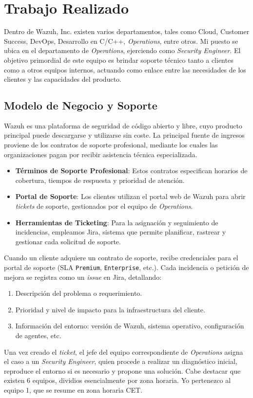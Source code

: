 \chapter{Trabajo Realizado}

Dentro de Wazuh, Inc. existen varios departamentos, tales como Cloud, Customer Success, DevOps, Desarrollo en C/C++, \emph{Operations}, entre otros. Mi puesto se ubica en el departamento de \emph{Operations}, ejerciendo como \emph{Security Engineer}. El objetivo primordial de este equipo es brindar soporte técnico tanto a clientes como a otros equipos internos, actuando como enlace entre las necesidades de los clientes y las capacidades del producto.

\section{Modelo de Negocio y Soporte}
Wazuh es una plataforma de seguridad de código abierto y libre, cuyo producto principal puede descargarse y utilizarse sin coste. La principal fuente de ingresos proviene de los contratos de soporte profesional, mediante los cuales las organizaciones pagan por recibir asistencia técnica especializada.  
\begin{itemize}
  \item \textbf{Términos de Soporte Profesional}: Estos contratos especifican horarios de cobertura, tiempos de respuesta y prioridad de atención.  
  \item \textbf{Portal de Soporte}: Los clientes utilizan el portal web de Wazuh para abrir \emph{tickets} de soporte, gestionados por el equipo de \emph{Operations}.  
  \item \textbf{Herramientas de Ticketing}: Para la asignación y seguimiento de incidencias, empleamos Jira, sistema que permite planificar, rastrear y gestionar cada solicitud de soporte.  
\end{itemize}

Cuando un cliente adquiere un contrato de soporte, recibe credenciales para el portal de soporte (SLA \texttt{Premium}, \texttt{Enterprise}, etc.). Cada incidencia o petición de mejora se registra como un \emph{issue} en Jira, detallando:  
\begin{enumerate}  
  \item Descripción del problema o requerimiento.  
  \item Prioridad y nivel de impacto para la infraestructura del cliente.  
  \item Información del entorno: versión de Wazuh, sistema operativo, configuración de agentes, etc.  
\end{enumerate}
Una vez creado el \emph{ticket}, el jefe del equipo correspondiente de \emph{Operations} asigna el caso a un \emph{Security Engineer}, quien procede a realizar un diagnóstico inicial, reproduce el entorno si es necesario y propone una solución. Cabe destacar que existen 6 equipos, dividios esencialmente por zona horaria. Yo pertenezco al equipo 1, que se resume en zona horaria CET.

